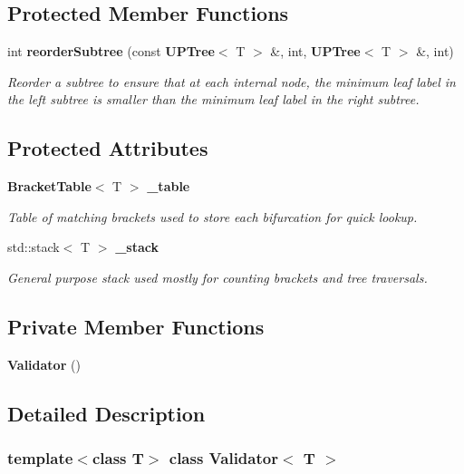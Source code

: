 \subsection*{Protected Member Functions}
\begin{CompactItemize}
\item 
int {\bf reorder\-Subtree} (const {\bf UPTree}$<$ T $>$ \&, int, {\bf UPTree}$<$ T $>$ \&, int)
\begin{CompactList}\small\item\em Reorder a subtree to ensure that at each internal node, the minimum leaf label in the left subtree is smaller than the minimum leaf label in the right subtree. \item\end{CompactList}\end{CompactItemize}
\subsection*{Protected Attributes}
\begin{CompactItemize}
\item 
{\bf Bracket\-Table}$<$ T $>$ {\bf \_\-table}
\begin{CompactList}\small\item\em Table of matching brackets used to store each bifurcation for quick lookup. \item\end{CompactList}\item 
std::stack$<$ T $>$ {\bf \_\-stack}
\begin{CompactList}\small\item\em General purpose stack used mostly for counting brackets and tree traversals. \item\end{CompactList}\end{CompactItemize}
\subsection*{Private Member Functions}
\begin{CompactItemize}
\item 
{\bf Validator} ()
\end{CompactItemize}


\subsection{Detailed Description}
\subsubsection*{template$<$class T$>$ class Validator$<$ T $>$}

